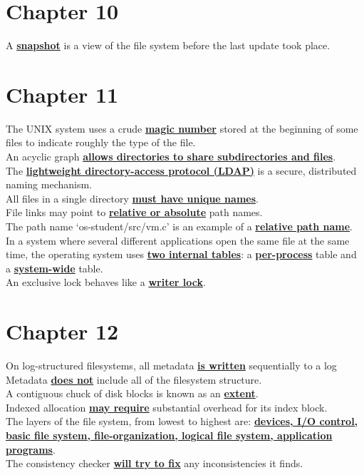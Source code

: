 \documentclass[10pt]{article}
\newcommand{\qw}[1]{\textbf{\ul{#1}}}
\begin{document}
\section*{\centering Chapter 10}
A \qw{snapshot} is a view of the file system before the last update took place.\\[2mm]
\newpage



\section*{\centering Chapter 11}
The UNIX system uses a crude \qw{magic number} stored at the beginning of some files to indicate roughly the type of the file.\\[2mm]
An acyclic graph \qw{allows directories to share subdirectories and files}.\\[2mm]
The \qw{lightweight directory-access protocol (LDAP)} is a secure, distributed naming mechanism.\\[2mm]
All files in a single directory \qw{must have unique names}.\\[2mm]
File links may point to \qw{relative or absolute} path names.\\[2mm]
The path name `os-student/src/vm.c' is an example of a \qw{relative path name}.\\[2mm]
In a system where several different applications open the same file at the same time, the operating system uses \qw{two internal tables}: a \qw{per-process} table and a \qw{system-wide} table.\\[2mm]
An exclusive lock behaves like a \qw{writer lock}.\\[2mm]
\newpage



\section*{\centering Chapter 12}
On log-structured filesystems, all metadata \qw{is written} sequentially to a log\\[2mm]
Metadata \qw{does not} include all of the filesystem structure.\\[2mm]
A contiguous chuck of disk blocks is known as an \qw{extent}.\\[2mm]
Indexed allocation \qw{may require} substantial overhead for its index block.\\[2mm]
The layers of the file system, from lowest to highest are: \qw{devices, I/O control, basic file system, file-organization, logical file system, application programs}.\\[2mm]
The consistency checker \qw{will try to fix} any inconsistencies it finds.\\[2mm]
\newpage
\end{document}
